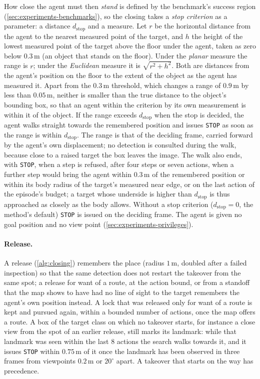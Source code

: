 \documentclass[10pt]{article}
\newcommand{\code}[1]{\texttt{#1}}
\newcommand{\m}{\,\mathrm{m}}
\newcommand{\degree}{^{\circ}}
\begin{document}
How close the agent must then \emph{stand} is defined by the benchmark's
success region (\cref{sec:experiments-benchmarks}), so the closing takes a
\emph{stop criterion} as a parameter: a distance $d_{\mathrm{stop}}$ and a
measure. Let
$r$ be the horizontal distance from the agent to the nearest measured point
of the target, and $h$ the height of the lowest measured point of the target
above the floor under the agent, taken as zero below $0.3\m$ (an object that
stands on the floor). Under the \emph{planar} measure the range is $r$; under
the \emph{Euclidean} measure it is $\sqrt{r^2+h^2}$. Both are distances from
the agent's position on the floor to the extent of the object as the agent
has measured it. Apart from the $0.3\m$ threshold, which changes a range of
$0.9\m$ by less than $0.05\m$, neither is smaller than the true distance to
the object's bounding box, so that an agent within the criterion by its own
measurement is within it of the object. If the range exceeds $d_{\mathrm{stop}}$ when the stop
is decided, the agent walks straight towards the remembered position and
issues \code{STOP} as soon as the range is within $d_{\mathrm{stop}}$. The
range is that of the deciding frame, carried forward by the agent's own
displacement; no detection is consulted during the walk, because close to a
raised target the box leaves the image. The walk also ends, with \code{STOP},
when a step is refused, after four steps or seven actions, when a further step
would bring the agent within $0.3\m$ of the remembered position or within its
body radius of the target's measured near edge, or on the last action of
the episode's budget; a target whose underside is higher than
$d_{\mathrm{stop}}$ is thus approached as closely as the body allows. Without a stop criterion ($d_{\mathrm{stop}}=0$, the method's
default) \code{STOP} is issued on the deciding frame. The agent is given no
goal position and no view point (\cref{sec:experiments-privileges}).

\paragraph{Release.} A release (\cref{alg:closing}) remembers the
place (radius $1\m$, doubled after a failed inspection) so that the same
detection does not restart the takeover from the same spot; a release for want
of a route, at the action bound, or from a standoff that the map shows to have
had no line of sight to the target remembers the agent's own position instead.
A lock that
was released only for want of a route is kept and pursued again, within a
bounded number of actions, once the map offers a route. A box of the target
class on which no takeover starts, for instance a close view from the spot of
an earlier release, still marks its landmark: while that landmark was seen
within the last $8$ actions the search walks towards it, and it issues
\code{STOP} within $0.75\m$ of it once the landmark has been observed in three
frames from viewpoints $0.2\m$ or $20\degree$ apart. A takeover that starts on
the way has precedence.
\end{document}
